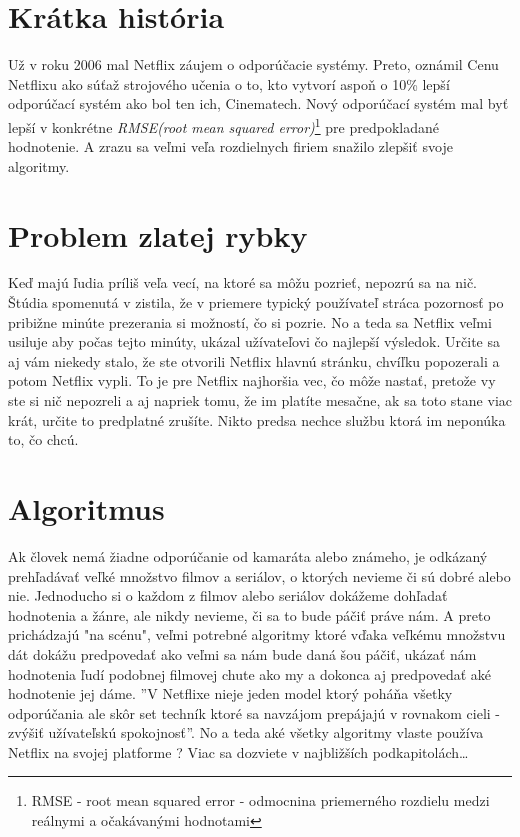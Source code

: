 \documentclass[10pt,twoside,slovak,a4paper]{article}
\begin{document}
\section{Krátka história} \label{Netflix cena} %
Už v roku 2006 mal Netflix záujem o odporúčacie systémy.\cite{amatriain2015recommender} Preto, oznámil Cenu Netflixu ako súťaž strojového učenia o to, kto vytvorí aspoň o 10\% lepší odporúčací systém ako bol ten ich, Cinematech. Nový odporúčací systém mal byť lepší v konkrétne \textit{RMSE(root mean squared error)}\footnote{RMSE - root mean squared error - odmocnina priemerného rozdielu medzi reálnymi a očakávanými hodnotami\cite{EncyclopaediaBritannica}} pre predpokladané hodnotenie. A zrazu sa veľmi veľa rozdielnych firiem snažilo zlepšiť svoje algoritmy.

\section{Problem zlatej rybky} \label{Krátka pozornosť}
Keď majú ľudia príliš veľa vecí, na ktoré sa môžu pozrieť, nepozrú sa na nič. Štúdia spomenutá v \cite{10.1145/2843948} zistila, že v priemere typický používateľ stráca pozornosť po pribižne minúte prezerania si možností, čo si pozrie. No a teda sa Netflix veľmi usiluje aby počas tejto minúty, ukázal užívateľovi čo najlepší výsledok. Určite sa aj vám niekedy stalo, že ste otvorili Netflix hlavnú stránku, chvíľku popozerali a potom Netflix vypli. To je pre Netflix najhoršia vec, čo môže nastať, pretože vy ste si nič nepozreli a aj napriek tomu, že im platíte mesačne, ak sa toto stane viac krát, určite to predplatné zrušíte. Nikto predsa nechce službu ktorá im neponúka to, čo chcú.

\section{Algoritmus} \label{Algoritmus}
Ak človek nemá žiadne odporúčanie od kamaráta alebo známeho, je odkázaný prehľadávať veľké množstvo filmov a seriálov, o ktorých nevieme či sú dobré alebo nie. Jednoducho si o každom z filmov alebo seriálov dokážeme dohľadať hodnotenia a žánre, ale nikdy nevieme, či sa to bude páčiť práve nám. A preto prichádzajú "na scénu", veľmi potrebné algoritmy ktoré vďaka veľkému množstvu dát dokážu predpovedať ako veľmi sa nám bude daná šou páčiť, ukázať nám hodnotenia ľudí podobnej filmovej chute ako my a dokonca aj predpovedať aké hodnotenie jej dáme. ''V Netflixe nieje jeden model ktorý poháňa všetky odporúčania ale skôr set techník ktoré sa navzájom prepájajú v rovnakom cieli - zvýšiť užívateľskú spokojnosť''\cite{Steck_Baltrunas_Elahi_Liang_Raimond_Basilico_2021}. No a teda aké všetky algoritmy vlaste používa Netflix na svojej platforme ? Viac sa dozviete v najbližších podkapitolách\ldots
\end{document}
